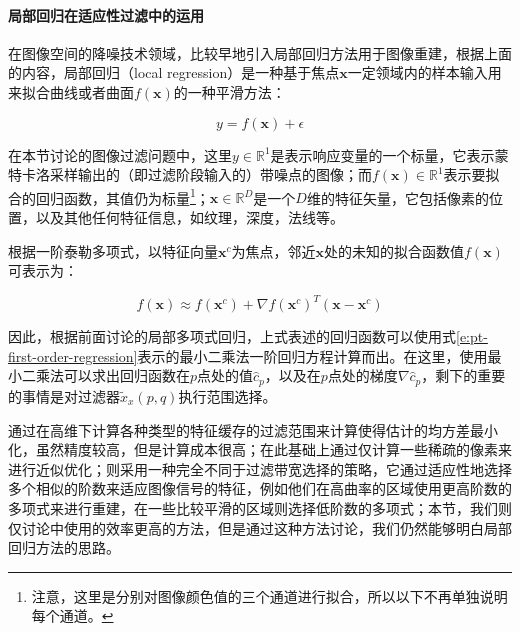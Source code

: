 \paragraph{局部回归在适应性过滤中的运用}
在图像空间的降噪技术领域，\cite{a:AdaptiveRenderingbasedonWeightedLocalRegression}比较早地引入局部回归方法用于图像重建，根据上面的内容，局部回归（local regression）是一种基于焦点$\mathbf{x}$一定领域内的样本输入用来拟合曲线或者曲面$f(\mathbf{x})$的一种平滑方法：

\begin{equation}
	y=f(\mathbf{x})+\epsilon
\end{equation}

在本节讨论的图像过滤问题中，这里$y\in\mathbb{R}^{1}$是表示响应变量的一个标量，它表示蒙特卡洛采样输出的（即过滤阶段输入的）带噪点的图像；而$f(\mathbf{x})\in\mathbb{R}^{1}$表示要拟合的回归函数，其值仍为标量\footnote{注意，这里是分别对图像颜色值的三个通道进行拟合，所以以下不再单独说明每个通道。}；$\mathbf{x}\in\mathbb{R}^{D}$是一个$D$维的特征矢量，它包括像素的位置，以及其他任何特征信息，如纹理，深度，法线等。

根据一阶泰勒多项式，以特征向量$\mathbf{x}^{c}$为焦点，邻近$\mathbf{x}$处的未知的拟合函数值$f(\mathbf{x})$可表示为：

\begin{equation}
	f(\mathbf{x})\approx f(\mathbf{x}^{c})+\nabla f(\mathbf{x}^{c})^{T}(\mathbf{x}-\mathbf{x}^{c})
\end{equation}

因此，根据前面讨论的局部多项式回归，上式表述的回归函数可以使用式\ref{e:pt-first-order-regression}表示的最小二乘法一阶回归方程计算而出。在这里，使用最小二乘法可以求出回归函数在$p$点处的值$\hat{c}_p$，以及在$p$点处的梯度$\nabla \hat{c}_p$，剩下的重要的事情是对过滤器$\tilde{x}_x(p,q)$执行范围选择。

\cite{a:AdaptiveRenderingbasedonWeightedLocalRegression}通过在高维下计算各种类型的特征缓存的过滤范围来计算使得估计的均方差最小化，虽然精度较高，但是计算成本很高；\cite{a:AdaptiveRenderingwithLinearPredictions}在此基础上通过仅计算一些稀疏的像素来进行近似优化；\cite{a:AdaptivePolynomialRendering}则采用一种完全不同于过滤带宽选择的策略，它通过适应性地选择多个相似的阶数来适应图像信号的特征，例如他们在高曲率的区域使用更高阶数的多项式来进行重建，在一些比较平滑的区域则选择低阶数的多项式；本节，我们则仅讨论\cite{a:NonlinearlyWeightedFirstorderRegressionforDenoisingMonteCarloRenderings}中使用的效率更高的方法，但是通过这种方法讨论，我们仍然能够明白局部回归方法的思路。

